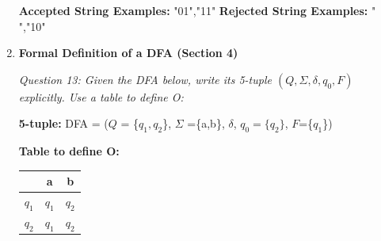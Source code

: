 \documentclass[10pt,letterpaper,unboxed,cm]{article}
\begin{document}
\begin{enumerate}
\textbf{Accepted String Examples: }"01","11" \newline
\textbf{Rejected String Examples: }" ","10" \newline

\pagebreak

\item \textbf{Formal Definition of a DFA (Section 4)} \newline

\emph{Question 13: Given the DFA below, write its 5-tuple $(Q, \Sigma, \delta, q_0, F)$ explicitly. Use a table to define O:} \newline

\textbf{5-tuple:} DFA = ($Q$ = \{$q_1,q_2$\}, $\Sigma$ =\{a,b\}, $\delta$, $q_0=\{q_2\}$, $F$=\{$q_1$\}) \newline 

\textbf{Table to define O: }
\begin{center}
    \begin{tabular}{||c || c c||} 
     \hline
         & \textbf{a} & \textbf{b}\\ [0.5ex] 
     \hline\hline
     \textbf{$q_1$} & $q_1$ & $q_2$\\ 
     \hline
     \textbf{$q_2$} & $q_1$ & $q_2$ \\
    \end{tabular}
    \end{center}
\end{enumerate}
\end{document}
